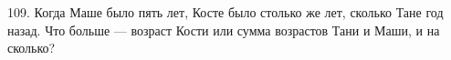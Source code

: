 109. Когда Маше было пять лет, Косте было столько же лет, сколько Тане год назад. Что больше --- возраст Кости или сумма возрастов Тани и Маши, и на сколько?\\
